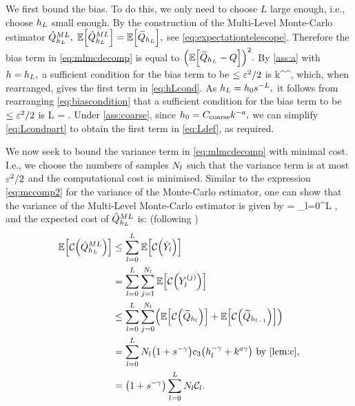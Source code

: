 We first bound the bias. To do this, we only need to choose $L$ large enough, i.e., choose $h_{L}$ small enough. By the construction of the Multi-Level Monte-Carlo estimator $\hat{Q}^{ML}_{h_{L}},$ $\EXP{\QhatMLhL} = \EXP{\QhLtilde},$ see \cref{eq:expectationtelescope}. Therefore the bias term in \cref{eq:mlmcdecomp} is equal to $\mleft(\EXP{\QhLtilde - Q}\mright)^2.$ By \cref{ass:a} with $h=h_{L},$ a sufficient condition for the bias term to be $\leq \varepsilon^2/2$ is
\beq\label{eq:biascondition}
\co k^\sigma \hL^\alpha \leq {},
\eeq
which, when rearranged, gives the first term in \eqref{eq:hLcond}. As $h_{L} = h_{0} s^{-L},$ it follows from rearranging \cref{eq:biascondition} that a sufficient condition for the bias term to be $\leq \varepsilon^2/2$ is
\beq\label{eq:Lcondpart}
L = .
\eeq
Under \cref{ass:coarse}, since $h_{0} = C_{\mathrm{coarse}} k^{-a},$ we can simplify \eqref{eq:Lcondpart} to obtain the first term in \eqref{eq:Ldef}, as required.

We now seek to bound the variance term in \cref{eq:mlmcdecomp} with minimal cost. I.e., we choose the numbers of samples $N_{l}$ such that the variance term is at most $\varepsilon^2/2$ and the computational cost is minimised. Similar to the expression \cref{eq:mccomp2} for the variance of the Monte-Carlo estimator, one can show that the variance of the Multi-Level Monte-Carlo estimator is given by
\beq\label{eq:mlmcvariance}
\VAR{\QhatMLhL} = \sum_{l=0}^L \frac{\Vl}{\Nl},
\eeq
and the expected cost of $\hat{Q}^{ML}_{h_{L}}$ is: (following \cite{GrPaSc:19})
\begin{align}
\EXP{\Cost{\QhatMLhL}}&\leq \sum_{l=0}^L \EXP{\Cost{\Ylhat}}\nonumber\\
&= \sum_{l=0}^L \sum_{j=1}^{\Nl} \EXP{\Cost{\Ylj}}\nonumber\\
&\leq \sum_{l=0}^L \sum_{j=0}^{\Nl} \mleft(\EXP{\Cost{\Qhltilde}} + \EXP{\Cost{\Qhlmotilde}}\mright)\nonumber\\
&=\sum_{l=0}^L \Nl\mleft(1+s^{-\gamma}\mright) \cth \mleft(\hl^{-\gamma}+k^{a\gamma}\mright) \text{ by \cref{lem:c},}\nonumber\\
&= \mleft(1+s^{-\gamma}\mright) \sum_{l=0}^L \Nl\Cl.\label{eq:Cboundformin}
\end{align}

